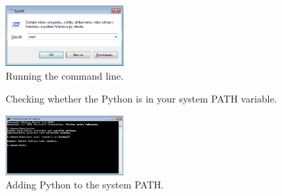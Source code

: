 \begin{figure}[htb]
	\centering
	\includegraphics[width=0.4\textwidth]{spustit_cmd.png}
	\caption{Running the command line.}
	\label{fig:run_cmd}
\end{figure}

\begin{figure}[htb]
	\centering
	\hskip 0.2cm
	\caption{Checking whether the Python is in your system PATH variable.}
	\label{fig:cmd_python_help}
\end{figure}

\begin{figure}[htb]
	\centering
	\includegraphics[width=0.4\textwidth]{cmd_python_added.png}
	\caption{Adding Python to the system PATH.}
	\label{fig:cmd_python_added}
\end{figure}


